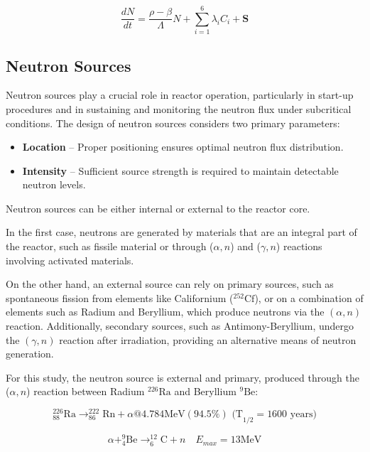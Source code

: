 \begin{equation}
\frac{dN}{dt} = \frac{\rho - \beta}{\Lambda} N + \sum_{i=1}^{6} \lambda_i C_i + \mathbf{S}
\end{equation}

\subsection{Neutron Sources}

Neutron sources play a crucial role in reactor operation, particularly in start-up procedures and in sustaining and monitoring the neutron flux under subcritical conditions. The design of neutron sources considers two primary parameters:
\begin{itemize}
    \item \textbf{Location} – Proper positioning ensures optimal neutron flux distribution.
    \item \textbf{Intensity} – Sufficient source strength is required to maintain detectable neutron levels.
\end{itemize}

Neutron sources can be either internal or external to the reactor core. 

In the first case, neutrons are generated by materials that are an integral part of the reactor, such as fissile material or through ($\alpha, n$) and ($\gamma, n$) reactions involving activated materials. 

On the other hand, an external source can rely on primary sources, such as spontaneous fission from elements like Californium ($^{252}\text{Cf}$), or on a combination of elements such as Radium and Beryllium, which produce neutrons via the $(\alpha, n)$ reaction. Additionally, secondary sources, such as Antimony-Beryllium, undergo the $(\gamma, n)$ reaction after irradiation, providing an alternative means of neutron generation.

For this study, the neutron source is external and primary, produced through the ($\alpha, n$) reaction between Radium $^{226}\text{Ra}$ and Beryllium $^9\text{Be}$:

\begin{equation}
^{226}_{88}\text{Ra} \rightarrow ^{222}_{86}\text{Rn} + \alpha @ 4.784 \text{MeV} (94.5\%) \text{ (T}_{1/2} = 1600 \text{ years})    
\end{equation}

\begin{equation}
\alpha + ^9_4\text{Be} \rightarrow ^{12}_6\text{C} + n \quad E_{max} = 13 \text{MeV}
\end{equation}



